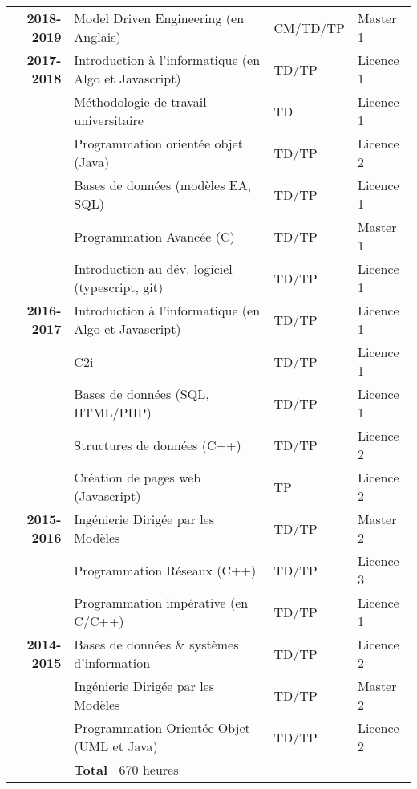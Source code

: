 
\begin{tabular}{r @{~$\rangle$~} p{} l l}

\textbf{2018-2019} & Model Driven Engineering (en Anglais) & CM/TD/TP & Master 1 \\
                   
\textbf{2017-2018} & Introduction à l'informatique (en Algo et Javascript) & TD/TP & Licence 1 \\
			 & Méthodologie de travail universitaire & TD & Licence 1 \\
			 & Programmation orientée objet (Java) & TD/TP & Licence 2 \\
			 & Bases de données (modèles EA, SQL) & TD/TP & Licence 1 \\
                   & Programmation Avancée (C) & TD/TP & Master 1 \\
                   & Introduction au dév. logiciel (typescript, git) & TD/TP & Licence 1 \\

\textbf{2016-2017} & Introduction à l'informatique (en Algo et Javascript) & TD/TP & Licence 1 \\
                   & C2i & TD/TP & Licence 1 \\
                   & Bases de données (SQL, HTML/PHP) & TD/TP & Licence 1 \\
                   & Structures de données (C++) & TD/TP & Licence 2 \\
                   & Création de pages web (Javascript) & TP & Licence 2  \vspace{3mm}\\

\textbf{2015-2016} & Ingénierie Dirigée par les Modèles & TD/TP & Master 2 \\
                   & Programmation Réseaux (C++) & TD/TP & Licence 3 \\
                   & Programmation impérative (en C/C++) & TD/TP & Licence 1 \vspace{3mm} \\

\textbf{2014-2015} & Bases de données $\&$ systèmes d'information & TD/TP & Licence 2 \\
                   & Ingénierie Dirigée par les Modèles & TD/TP & Master 2 \\
                   & Programmation Orientée Objet (UML et Java) & TD/TP & Licence 2 \vspace{3mm} \\

                   & {\bf Total~} $670$ heures & \\
\end{tabular}